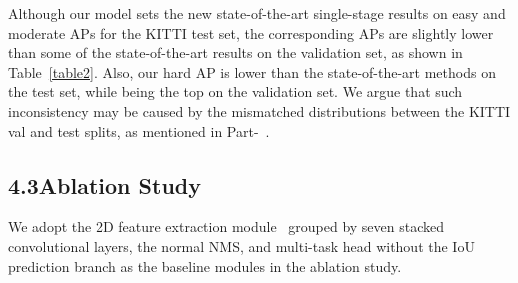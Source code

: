 \documentclass[letterpaper]{article}
\begin{document}
Although our model sets the new state-of-the-art single-stage results on easy and moderate APs for the KITTI test set, the corresponding APs are slightly lower than some of the state-of-the-art results on the validation set, as shown in Table~\ref{table2}.
Also, our hard AP is lower than the state-of-the-art methods on the test set, while being the top on the validation set.
We argue that such inconsistency may be caused by the mismatched distributions between the KITTI val and test splits, as mentioned in Part-~\cite{shi2020points}.




\subsection{4.3\quad Ablation Study}


We adopt the 2D feature extraction module~\cite{yan2018second} grouped by seven stacked convolutional layers, the normal NMS, and multi-task head without the IoU prediction branch as the baseline modules in the ablation study.
\end{document}
